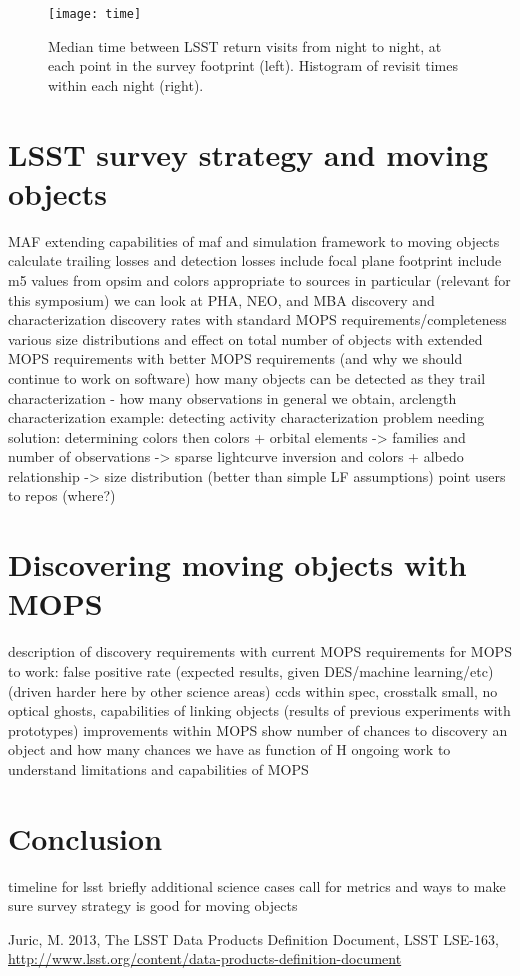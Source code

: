 \documentclass{iau}
\begin{document}
\begin{figure}
\centering
\texttt{[image: time]}
\caption{Median time between LSST return visits from night to night,
  at each point in the survey footprint (left). Histogram of revisit times
  within each night (right). 
\label{time}}
\end{figure}


\section{LSST survey strategy and moving objects}

MAF 
extending capabilities of maf and simulation framework to moving
objects
calculate trailing losses and detection losses
include focal plane footprint
include m5 values from opsim and colors appropriate to sources
in particular (relevant for this symposium) we can look at PHA, NEO,
and MBA discovery and characterization
discovery rates with standard MOPS requirements/completeness
 various size distributions and effect on total number of objects
with extended MOPS requirements
with better MOPS requirements (and why we should continue to work on software)
how many objects can be detected as they trail
characterization - how many observations in general we obtain,
arclength
characterization example: detecting activity
characterization problem needing solution: determining colors
then colors + orbital elements -> families
and number of observations -> sparse lightcurve inversion
and colors + albedo relationship -> size distribution (better than
simple LF assumptions)
point users to repos (where?)

\section{Discovering moving objects with MOPS}
description of discovery requirements with current MOPS
requirements for MOPS to work:
 false positive rate (expected results, given DES/machine
 learning/etc) (driven harder here by other science areas)
   ccds within spec, crosstalk small, no optical ghosts, 
 capabilities of linking objects (results of previous experiments with
 prototypes)  improvements within MOPS
show number of chances to discovery an object and how many chances we
have as function of H 
ongoing work to understand limitations and capabilities of MOPS

\section{Conclusion}
timeline for lsst
briefly additional science cases
call for metrics and ways to make sure survey strategy is good for
moving objects



\begin{thebibliography}{}

{Juric, M.} 2013, The LSST Data Products Definition Document, LSST LSE-163,
\url{http://www.lsst.org/content/data-products-definition-document}

\end{thebibliography}

\end{document}
